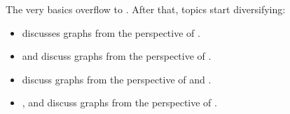 The very basics overflow to . After that, topics start diversifying:
\begin{itemize}
  \item {} discusses graphs from the perspective of .
  \item {} and  discuss graphs from the perspective of .
  \item {} discuss graphs from the perspective of  and .
  \item {},  and  discuss graphs from the perspective of .
\end{itemize}

